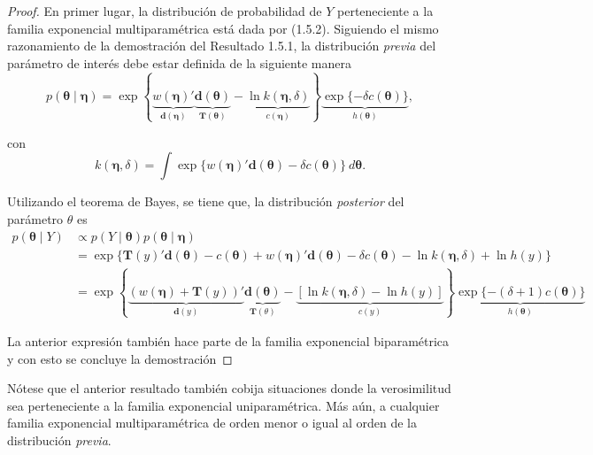 \documentclass[
  spanish,
  letter]{book}
\theoremstyle{definition}
\theoremstyle{definition}
\theoremstyle{definition}
\theoremstyle{remark}
\begin{document}
\begin{proof}
\iffalse{} {Proof. } \fi{}En primer lugar, la distribución de probabilidad de \(Y\) perteneciente a la familia exponencial multiparamétrica está dada por (1.5.2). Siguiendo el mismo razonamiento de la demostración del Resultado 1.5.1, la distribución \emph{previa} del parámetro de interés debe estar definida de la siguiente manera
\begin{equation}
p(\boldsymbol \theta\mid \boldsymbol \eta)=\exp\left\{\underbrace{w(\boldsymbol \eta)'}_{\mathbf{d}(\boldsymbol \eta)}
\underbrace{\mathbf{d}(\boldsymbol \theta)}_{\mathbf{T}(\boldsymbol \theta)} - \underbrace{\ln k(\boldsymbol \eta,\delta)}_{c(\boldsymbol \eta)}\right\}\underbrace{\exp\{-\delta c(\boldsymbol \theta)\}}_{h(\boldsymbol \theta)},
\end{equation}

con
\begin{equation*}
k(\boldsymbol \eta,\delta)=\int\exp\{w(\boldsymbol \eta)'\mathbf{d}(\boldsymbol \theta)-\delta c(\boldsymbol \theta)\} \ d\boldsymbol \theta.
\end{equation*}

Utilizando el teorema de Bayes, se tiene que, la distribución \emph{posterior} del parámetro \(\theta\) es
\begin{align*}
p(\boldsymbol \theta\mid Y) &\propto p(Y \mid \boldsymbol \theta)p(\boldsymbol \theta\mid \boldsymbol \eta)\\
&= \exp\{\mathbf{T}(y)'\mathbf{d}(\boldsymbol \theta) - c(\boldsymbol \theta) + w(\boldsymbol \eta)' \mathbf{d}(\boldsymbol \theta) - \delta c(\boldsymbol \theta) - \ln k(\boldsymbol \eta,\delta) +\ln h(y)\}\\
& =
\exp\left\{\underbrace{(w(\boldsymbol \eta)+\mathbf{T}(y))'}_{\mathbf{d}(y)}
\underbrace{\mathbf{d}(\boldsymbol \theta)}_{\mathbf{T}(\theta)} - \underbrace{\left[\ln k(\boldsymbol \eta,\delta)-\ln h(y)\right]}_{c(y)}\right\}\underbrace{\exp\{-(\delta+1)c(\boldsymbol \theta)\}}_{h(\boldsymbol \theta)}
\end{align*}

La anterior expresión también hace parte de la familia exponencial biparamétrica y con esto se concluye la demostración
\end{proof}

Nótese que el anterior resultado también cobija situaciones donde la verosimilitud sea perteneciente a la familia exponencial uniparamétrica. Más aún, a cualquier familia exponencial multiparamétrica de orden menor o igual al orden de la distribución \emph{previa}.
\end{document}
